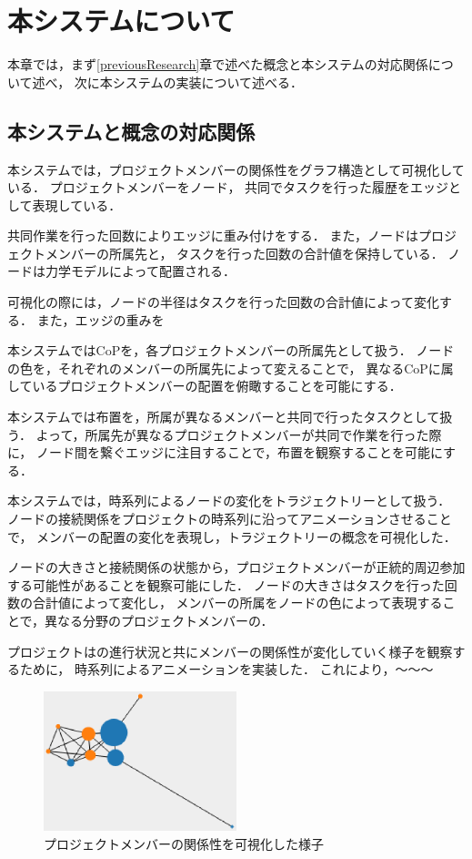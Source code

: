 \documentclass[submit,techrep]{ipsj}
\begin{document}
\section{本システムについて}

本章では，まず\ref{previousResearch}章で述べた概念と本システムの対応関係について述べ，
次に本システムの実装について述べる．

\subsection{本システムと概念の対応関係}

本システムでは，プロジェクトメンバーの関係性をグラフ構造として可視化している．
プロジェクトメンバーをノード，
共同でタスクを行った履歴をエッジとして表現している．



共同作業を行った回数によりエッジに重み付けをする．
また，ノードはプロジェクトメンバーの所属先と，
タスクを行った回数の合計値を保持している．
ノードは力学モデルによって配置される．

可視化の際には，ノードの半径はタスクを行った回数の合計値によって変化する．
また，エッジの重みを

本システムではCoPを，各プロジェクトメンバーの所属先として扱う．
ノードの色を，それぞれのメンバーの所属先によって変えることで，
異なるCoPに属しているプロジェクトメンバーの配置を俯瞰することを可能にする．

本システムでは布置を，所属が異なるメンバーと共同で行ったタスクとして扱う．
よって，所属先が異なるプロジェクトメンバーが共同で作業を行った際に，
ノード間を繋ぐエッジに注目することで，布置を観察することを可能にする．

本システムでは，時系列によるノードの変化をトラジェクトリーとして扱う．
ノードの接続関係をプロジェクトの時系列に沿ってアニメーションさせることで，
メンバーの配置の変化を表現し，トラジェクトリーの概念を可視化した．

ノードの大きさと接続関係の状態から，プロジェクトメンバーが正統的周辺参加する可能性があることを観察可能にした．
ノードの大きさはタスクを行った回数の合計値によって変化し，
メンバーの所属をノードの色によって表現することで，異なる分野のプロジェクトメンバーの．

プロジェクトはの進行状況と共にメンバーの関係性が変化していく様子を観察するために，
時系列によるアニメーションを実装した．
これにより，〜〜〜

\begin{figure}[h]
  \centering
  \includegraphics[width=0.5\textwidth]{img/cop-map-graph.eps}
  \caption{プロジェクトメンバーの関係性を可視化した様子}
  \label{cop-map-graph}
\end{figure}
\end{document}
